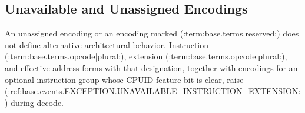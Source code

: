\subsection{Unavailable and Unassigned Encodings}
An unassigned encoding or an encoding marked (:term:base.terms.reserved:) does not define alternative
architectural behavior. Instruction (:term:base.terms.opcode|plural:), extension
(:term:base.terms.opcode|plural:), and effective-address forms with that designation, together with encodings
for an optional instruction group whose CPUID feature bit is clear, raise
(:ref:base.events.EXCEPTION.UNAVAILABLE_INSTRUCTION_EXTENSION:) during decode.
